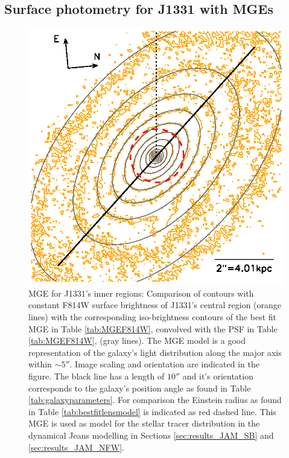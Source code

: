 \subsection{Surface photometry for J1331 with MGEs} \label{sec:MGE_results}


\begin{figure}
\centering
\includegraphics[width=0.8\columnwidth]{fig/1331F814Wsci_MGE_M.ps}
\caption{MGE for J1331's inner regions: Comparison of contours with constant F814W surface brightness of J1331's central region (orange lines) with the corresponding iso-brightness contours of the best fit MGE in Table \ref{tab:MGEF814W}, convolved with the PSF in Table \ref{tab:MGEF814W}, (gray lines). The MGE model is a good representation of the galaxy's light distribution along the major axis within $\sim 5''$. Image scaling and orientation are indicated in the figure. The black line has a length of $10''$ and it's orientation corresponds to the galaxy's position angle as found in Table \ref{tab:galaxyparameters}. For comparison the Einstein radius as found in Table \ref{tab:bestfitlensmodel}  is indicated as red dashed line. This MGE is used as model for the stellar tracer distribution in the dynamical Jeans modelling in Sections \ref{sec:results_JAM_SB} and \ref{sec:results_JAM_NFW}.}
\label{fig:MGEinnerRegions}
\end{figure}

